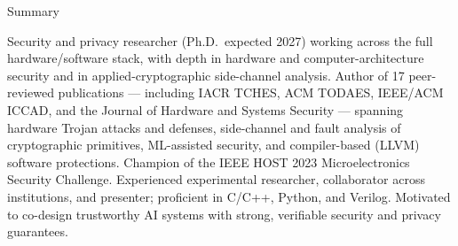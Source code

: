 \documentclass{resume} %
\begin{document}

\begin{rSection}{Summary}

Security and privacy researcher (Ph.D.\ expected 2027) working across the full hardware/software stack, with depth in hardware and computer-architecture security and in applied-cryptographic side-channel analysis. Author of 17 peer-reviewed publications --- including IACR TCHES, ACM TODAES, IEEE/ACM ICCAD, and the Journal of Hardware and Systems Security --- spanning hardware Trojan attacks and defenses, side-channel and fault analysis of cryptographic primitives, ML-assisted security, and compiler-based (LLVM) software protections. Champion of the IEEE HOST 2023 Microelectronics Security Challenge. Experienced experimental researcher, collaborator across institutions, and presenter; proficient in C/C++, Python, and Verilog. Motivated to co-design trustworthy AI systems with strong, verifiable security and privacy guarantees.
\end{rSection}







\end{document}
